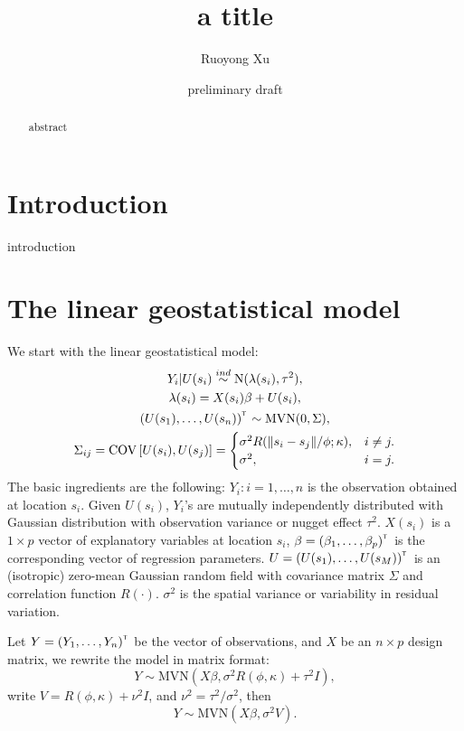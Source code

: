 \documentclass{article}\usepackage[]{graphicx}\usepackage[]{color}
\author{Ruoyong Xu}
\date{preliminary draft}
\def\N{{\text{N}}}
\def\MVN{{\text{MVN}}}
\def\cov{{\text{COV}}}
\def\T{{\footnotesize {^{_{\sf T}}}}}
\begin{document}
\title{a title}

\maketitle
\begin{abstract}
abstract

\end{abstract}





\section{Introduction} 
introduction

\section{The linear geostatistical model}
We start with the linear geostatistical model:
%
\begin{gather*}
Y_{i}|U(s_i) \overset{ind}\sim \N(\lambda(s_{i}),\tau^2 ),\\
\lambda(s_{i})=X(s_i)\beta+U(s_{i}),\\
(U(s_1), \dots,U(s_n))^\T \sim \MVN (0,\Sigma),\\
\Sigma_{ij}=\cov \left[U(s_i), U(s_j)\right]=\begin{cases} 
\sigma^2 R(\|s_i-s_j\|/\phi;\kappa),& i\neq j .\\
\sigma^2, & i=j.
\end{cases}
\end{gather*}
%
The basic ingredients are the following:
$Y_i: i=1,\dots,n$ is the observation obtained at location $s_i$. 
Given $U(s_i)$, $Y_i$'s are mutually independently distributed with Gaussian distribution with observation variance or nugget effect $\tau^2$.  
$X(s_i)$ is a $1 \times p$ vector of explanatory variables at location $s_i$, 
$\beta=(\beta_1,\dots,\beta_p)^\T$ is the corresponding vector of regression parameters. 
$U=(U(s_1), \dots,U(s_M))^\T $ is an (isotropic) zero-mean Gaussian random field with covariance matrix $\Sigma$ and correlation function $R(\cdot)$. 
$\sigma^2$ is the spatial variance or variability in residual variation.  

Let $Y=(Y_1,\dots,Y_n)^\T$ be the vector of observations, and $X$ be an $n \times p$ design matrix, we rewrite the model in matrix format:
%
\begin{equation} \label{eq:1}
Y \sim \MVN (X\beta, \sigma^2 R(\phi,\kappa)+\tau^2I), 
\end{equation}
% 
write $V=R(\phi,\kappa)+\nu^2I$, and $\nu^2={\tau^2}/{\sigma^2}$, then
\begin{equation*}
Y \sim \MVN (X\beta, \sigma^2 V).
\end{equation*}
\end{document}

